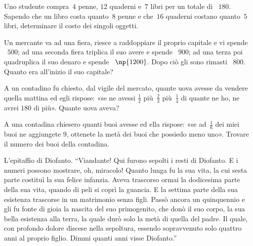 \begin{multicols}{2}
\begin{esercizio}[\Ast]
\label{ese:16.79}
Uno studente compra~$4$ penne, $12$ quaderni e~$7$ libri per un totale di \officialeuro~$180$. Sapendo che un libro costa quanto~$8$ penne e che~$16$ quaderni costano quanto~$5$ libri, determinare il costo dei singoli oggetti.
\end{esercizio}

\begin{esercizio}[\Ast]
\label{ese:16.80}
Un mercante va ad una fiera, riesce a raddoppiare il proprio capitale e vi spende \officialeuro~$500$; ad una seconda fiera triplica il suo avere e spende \officialeuro~$900$; ad una terza poi quadruplica il suo denaro e spende \officialeuro~$\np{1200}$. Dopo ciò gli sono rimasti \officialeuro~$800$. Quanto era all'inizio il suo capitale?
\end{esercizio}

\begin{esercizio}[\Ast]
\label{ese:16.81}
A un contadino fu chiesto, dal vigile del mercato, quante uova avesse da vendere quella mattina ed egli rispose: «se ne avessi $\frac{1}{2}$ più~$\frac{2}{3}$ più~$\frac{1}{4}$ di quante ne ho, ne avrei $180$ di più». Quante uova aveva?
\end{esercizio}

\begin{esercizio}[\Ast]
\label{ese:16.82}
A una contadina chiesero quanti buoi avesse ed ella rispose: «se ad~$\frac{1}{6}$ dei miei buoi ne aggiungete $9$, ottenete la metà dei buoi che possiedo meno uno». Trovare il numero dei buoi della contadina.
\end{esercizio}

\begin{esercizio}[\Ast]
\label{ese:16.83}
L'epitaffio di Diofanto. ``Viandante! Qui furono sepolti i resti di Diofanto. E i numeri possono mostrare, oh, miracolo! Quanto lunga fu la sua vita, la cui sesta parte costituì la sua felice infanzia. Aveva trascorso ormai la dodicesima parte della sua vita, quando di peli si coprì la guancia. E la settima parte della sua esistenza trascorse in un matrimonio senza figli. Passò ancora un quinquennio e gli fu fonte di gioia la nascita del suo primogenito, che donò il suo corpo, la sua bella esistenza alla terra, la quale durò solo la metà di quella del padre. Il quale, con profondo dolore discese nella sepoltura, essendo sopravvenuto solo quattro anni al proprio figlio. Dimmi quanti anni visse Diofanto.''
\end{esercizio}


\end{multicols}
